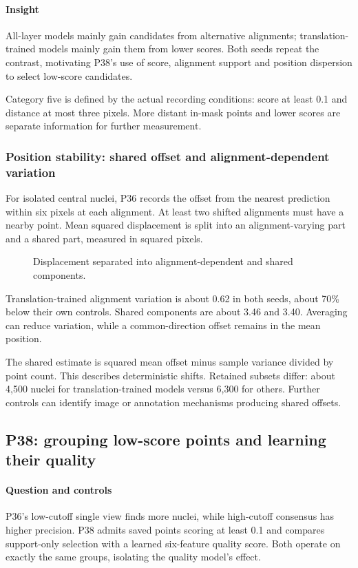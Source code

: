 \documentclass[
  12pt,
]{article}
\begin{document}
\paragraph{Insight}
All-layer models mainly gain candidates from alternative alignments; translation-trained models mainly gain them from lower scores. Both seeds repeat the contrast, motivating P38’s use of score, alignment support and position dispersion to select low-score candidates.

Category five is defined by the actual recording conditions: score at least 0.1 and distance at most three pixels. More distant in-mask points and lower scores are separate information for further measurement.

\subsubsection{Position stability: shared offset and alignment-dependent variation}\label{chapter31}
For isolated central nuclei, P36 records the offset from the nearest prediction within six pixels at each alignment. At least two shifted alignments must have a nearby point. Mean squared displacement is split into an alignment-varying part and a shared part, measured in squared pixels.

\begin{figure}[H]\centering\caption{Displacement separated into alignment-dependent and shared components.}\end{figure}
Translation-trained alignment variation is about 0.62 in both seeds, about 70\% below their own controls. Shared components are about 3.46 and 3.40. Averaging can reduce variation, while a common-direction offset remains in the mean position.

The shared estimate is squared mean offset minus sample variance divided by point count. This describes deterministic shifts. Retained subsets differ: about 4,500 nuclei for translation-trained models versus 6,300 for others. Further controls can identify image or annotation mechanisms producing shared offsets.

\subsection{P38: grouping low-score points and learning their quality}\label{chapter32}
\paragraph{Question and controls}
P36’s low-cutoff single view finds more nuclei, while high-cutoff consensus has higher precision. P38 admits saved points scoring at least 0.1 and compares support-only selection with a learned six-feature quality score. Both operate on exactly the same groups, isolating the quality model’s effect.
\end{document}
